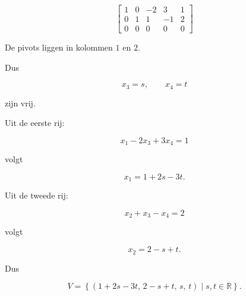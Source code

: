 \documentclass{ximera}
\begin{document}
\begin{oefening}{\oefB\ESS}
\begin{question}
\begin{oplossing}
\end{oplossing}

\end{question}


\begin{question}

\[
\left[
\begin{array}{cccc|c}
1&0&-2&3&1\\
0&1&1&-1&2\\
0&0&0&0&0
\end{array}
\right]
\]

\begin{oplossing}

De pivots liggen in kolommen \(1\) en \(2\).

Dus

\[
x_3=s,
\qquad
x_4=t
\]

zijn vrij.

Uit de eerste rij:

\[
x_1-2x_3+3x_4=1
\]

volgt

\[
x_1=1+2s-3t.
\]

Uit de tweede rij:

\[
x_2+x_3-x_4=2
\]

volgt

\[
x_2=2-s+t.
\]

Dus

\[
V=
\left\{
(1+2s-3t,\,2-s+t,\,s,\,t)
\mid s,t\in\mathbb{R}
\right\}.
\]

\end{oplossing}

\end{question}

\end{oefening}



\end{document}

